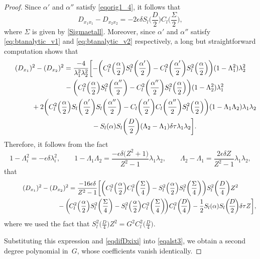 \documentclass[10pt,a4paper]{amsart}
\numberwithin{equation}{section}
\begin{document}
\begin{proof}
Since $\alpha'$ and $\alpha''$ satisfy \eqref{eqorig1_4}, it follows that
\begin{equation}\label{eqdifDxixi}
D_{x_1x_1}-D_{x_2x_2}=-2\epsilon\delta S_l\biggl(\frac{D}{2}\biggr) C_l\biggl(\frac{\Sigma}{2}\biggr),
\end{equation}
where $\Sigma$ is given by \eqref{Sigmaetall}. Moreover, since $\alpha'$ and $\alpha''$ satisfy
\eqref{eq:btanalytic_v1} and \eqref{eq:btanalytic_v2} respectively,
 a long but straightforward computation shows that
\begin{gather*}
(D_{x_1})^2-(D_{x_2})^2=\frac{-4}{\lambda_1^2\lambda_2^2}
\biggl[ -\biggl( C_l^2\Bigl(\frac{\alpha}{2}\Bigr)S_l^2\biggl(\frac{\alpha'}{2}\biggr)-
C_l^2\biggl(\frac{\alpha'}{2}\biggr)S_l^2\Bigl(\frac{\alpha}{2}\Bigr)\biggr) (1-\Lambda_1^2)\lambda_2^2 \\
\qquad\qquad{}-\biggl( C_l^2\Bigl(\frac{\alpha}{2}\Bigr)S_l^2\biggl(\frac{\alpha''}{2}\biggr)-
C_l^2\biggl(\frac{\alpha''}{2}\biggr)S_l^2\Bigl(\frac{\alpha}{2}\Bigr)\biggr) (1-\Lambda_2^2)\lambda_1^2 \\
\qquad\qquad{}+2\biggl( C_l^2\Bigl(\frac{\alpha}{2}\Bigr)S_l\biggl(\frac{\alpha'}{2}\biggr)S_l\biggl(\frac{\alpha''}{2}\biggr) - C_l\biggl(\frac{\alpha'}{2}\biggr)C_l\biggl(\frac{\alpha''}{2}\biggr)S_l^2\Bigl(\frac{\alpha}{2}\Bigr) \biggr)(1-\Lambda_1\Lambda_2)\lambda_1\lambda_2 \\
\qquad\qquad{} -S_l(\alpha)S_l\biggl(\frac{D}{2}\biggr) (\Lambda_2-\Lambda_1)\delta\tau\lambda_1\lambda_2 \biggr].
\end{gather*}
Therefore, it follows from the fact
\[
1-\Lambda_i^2=-\epsilon\delta\lambda_i^2, \qquad
1-\Lambda_1\Lambda_2=\frac{-\epsilon\delta\bigl(Z^2+1\bigr)}{Z^2-1} \lambda_1\lambda_2, \qquad
\Lambda_2-\Lambda_1=\frac{2\epsilon\delta Z}{Z^2-1}\lambda_1\lambda_2,
\]
 that
\begin{gather*}
(D_{x_1})^2-(D_{x_2})^2=\frac{-16\epsilon\delta}{Z^2-1}\biggl[ \biggl( C_l^2\Bigl(\frac{\alpha}{2} \Bigr) C_l^2\biggl(\frac{\Sigma}{4}\biggr)- S_l^2\Bigl(\frac{\alpha}{2}\Bigr) S_l^2\biggl(\frac{\Sigma}{4}\biggr) \biggr)
S_l^2\biggl(\frac{D}{4}\biggr)Z^2 \\
\hphantom{(D_{x_1})^2-(D_{x_2})^2=}{}
-\biggl(\! C_l^2\Bigl(\frac{\alpha}{2}\Bigr)S_l^2\biggl(\frac{\Sigma}{4}\biggr)-
S_l^2\Bigl(\frac{\alpha}{2} \Bigr) C_l^2\biggl(\frac{\Sigma}{4}\biggr)\!\biggr)
C_l^2\biggl(\!\frac{D}{4}\!\biggr)
 -\frac{1}{2}S_l(\alpha)S_l\biggl(\!\frac{D}{2}\!\biggr)\delta\tau Z
 \biggr],
\end{gather*}
where we used the fact that $S_l^2\bigl(\frac{D}{4}\bigr)Z^2=G^2 C_l^2\bigl(\frac{D}{4}\bigr)$.

Substituting this expression and \eqref{eqdifDxixi} into \eqref{eqalst3}, we obtain
a second degree polynomial in~$G$, whose coefficients vanish identically.
\end{proof}
\end{document}
